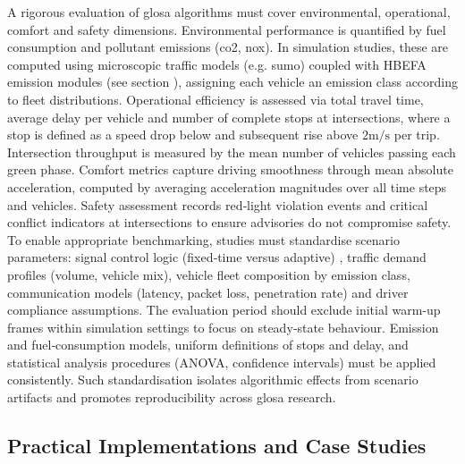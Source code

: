 A rigorous evaluation of \ac{glosa} algorithms must cover environmental, operational, comfort and safety dimensions. Environmental performance is quantified by fuel consumption and pollutant emissions (\ac{co2}, \ac{nox}). \cite{Kloeppel2019,Lenz2024} In simulation studies, these are computed using microscopic traffic models (e.g. \ac{sumo}) coupled with HBEFA emission modules (see section ), assigning each vehicle an emission class according to fleet distributions. Operational efficiency is assessed via total travel time, average delay per vehicle and number of complete stops at intersections, where a stop is defined as a speed drop below and subsequent rise above $2\unit{\metre\per\second}$ per trip. Intersection throughput is measured by the mean number of vehicles passing each green phase. Comfort metrics capture driving smoothness through mean absolute acceleration, computed by averaging acceleration magnitudes over all time steps and vehicles. Safety assessment records red‐light violation events and critical conflict indicators at intersections to ensure advisories do not compromise safety. \cite{Kloeppel2019,Lenz2024}
\mynewline
To enable appropriate benchmarking, studies must standardise scenario parameters: signal control logic (fixed‐time versus adaptive) \cite{Kloeppel2020}, traffic demand profiles (volume, vehicle mix), vehicle fleet composition by emission class, communication models (latency, packet loss, penetration rate) and driver compliance assumptions. The evaluation period should exclude initial warm‐up frames within simulation settings to focus on steady‐state behaviour. \cite{Lenz2024} Emission and fuel‐consumption models, uniform definitions of stops and delay, and statistical analysis procedures (ANOVA, confidence intervals) must be applied consistently. \cite{Kloeppel2019} Such standardisation isolates algorithmic effects from scenario artifacts and promotes reproducibility across \ac{glosa} research. \cite{Kloeppel2020}


\subsection{Practical Implementations and Case Studies}
\label{subsec:practical_implementations}

